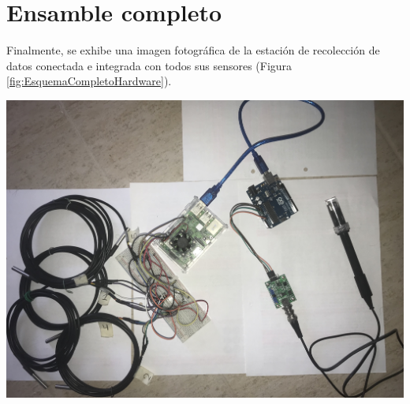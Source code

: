 \section{Ensamble completo}
\begin{minipage}{0.95 \textwidth}
    \par Finalmente, se exhibe una imagen fotográfica de la estación de recolección de datos conectada e integrada con todos sus sensores (Figura \ref{fig:EsquemaCompletoHardware}).\\
\end{minipage}
\begin{minipage}{0.95 \textwidth}
    
        \centering
        \includegraphics[scale=0.1]{hardware/SistemaEnsamblado.jpeg}
        \label{fig:EsquemaCompletoHardware}
    
\end{minipage}